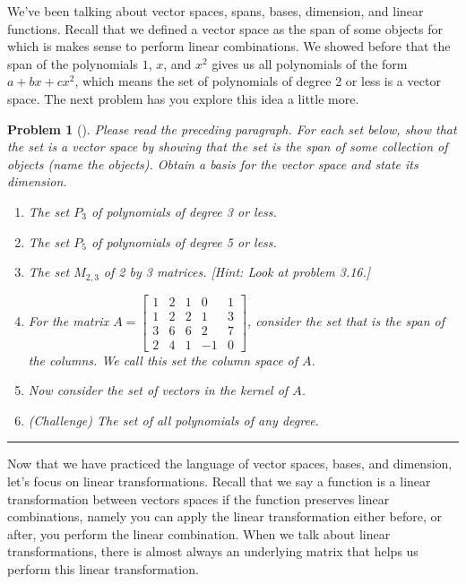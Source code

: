 \documentclass[letterpaper,oneside]{book}%
\theoremstyle{plain}
\theoremstyle{box}
\theoremstyle{problem}
\newtheorem{problemnum}{Problem}[chapter]
\newenvironment{problem}[1][]{\begin{problemnum}[#1]}{\end{problemnum}\nopagebreak\hrule\bigskip}
\newcommand{\bvec}[1]{\begin{bmatrix} #1 \end{bmatrix}}
\begin{document}
We've been talking about vector spaces, spans, bases, dimension, and linear functions.  Recall that we defined a vector space as the span of some objects for which is makes sense to perform linear combinations. We showed before that the span of the polynomials $1$, $x$, and $x^2$ gives us all polynomials of the form $a+bx+cx^2$, which means the set of polynomials of degree 2 or less is a vector space. The next problem has you explore this idea a little more. 
\begin{problem}
Please read the preceding paragraph.  For each set below, show that the set is a vector space by showing that the set is the span of some collection of objects (name the objects). Obtain a basis for the vector space and state its dimension.
\begin{enumerate}
 \item The set $P_3$ of polynomials of degree 3 or less.
 \item The set $P_5$ of polynomials of degree 5 or less. 
 \item The set $M_{2,3}$ of 2 by 3 matrices. [Hint: Look at problem 3.16.]
 \item For the matrix $A = 
 \bvec{
 1&2&1&0&1\\
 1&2&2&1&3\\
 3&6&6&2&7\\
 2&4&1&-1&0
 }$, consider the set that is the span of the columns.  We call this set the  column space of $A$.
 \item Now consider the set of vectors in the kernel of $A$. 
 \item (Challenge) The set of all polynomials of any degree.
\end{enumerate}

\end{problem}




Now that we have practiced the language of vector spaces, bases, and dimension, let's focus on linear transformations.  Recall that we say a function is a linear transformation between vectors spaces if the function preserves linear combinations, namely you can apply the linear transformation either before, or after, you perform the linear combination. 
When we talk about linear transformations, there is almost always an underlying matrix that helps us perform this linear transformation.
\end{document}
